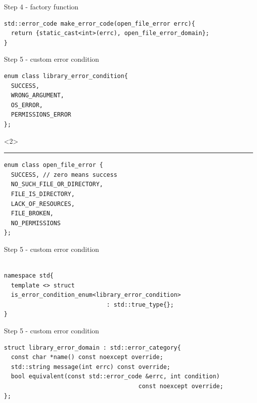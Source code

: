 \documentclass[10pt]{beamer}
\begin{document}
\begin{frame}[fragile]{Step 4 - factory function}
	\begin{verbatim}
std::error_code make_error_code(open_file_error errc){
  return {static_cast<int>(errc), open_file_error_domain};
}
	\end{verbatim}
\end{frame}

\begin{frame}[fragile]{Step 5 - custom error condition}
	\begin{verbatim}
enum class library_error_condition{
  SUCCESS,
  WRONG_ARGUMENT,
  OS_ERROR,
  PERMISSIONS_ERROR
};
	\end{verbatim}

	\begin{onlyenv}
	\hrule
	\vfill

	\begin{verbatim}
enum class open_file_error {
  SUCCESS, // zero means success
  NO_SUCH_FILE_OR_DIRECTORY,
  FILE_IS_DIRECTORY,
  LACK_OF_RESOURCES,
  FILE_BROKEN,
  NO_PERMISSIONS
};
	\end{verbatim}

	\end{onlyenv}

\end{frame}

\begin{frame}[fragile]{Step 5 - custom error condition}
	\begin{verbatim}

namespace std{
  template <> struct
  is_error_condition_enum<library_error_condition>
                             : std::true_type{};
}
	\end{verbatim}
\end{frame}

\begin{frame}[fragile]{Step 5 - custom error condition}
	\begin{verbatim}
struct library_error_domain : std::error_category{
  const char *name() const noexcept override;
  std::string message(int errc) const override;
  bool equivalent(const std::error_code &errc, int condition) 
                                      const noexcept override;
};
	\end{verbatim}
\end{frame}
\end{document}

